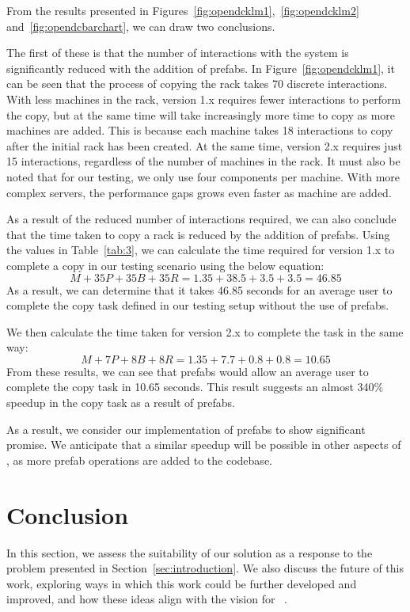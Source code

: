 \documentclass[11pt]{article}
\begin{document}
			From the results presented in Figures~\ref{fig:opendcklm1},~\ref{fig:opendcklm2} and~\ref{fig:opendcbarchart}, we can draw two conclusions.

			The first of these is that the number of interactions with the system is significantly reduced with the addition of prefabs.
			In Figure~\ref{fig:opendcklm1}, it can be seen that the process of copying the rack takes 70 discrete interactions.
			With less machines in the rack, version 1.x requires fewer interactions to perform the copy, but at the same time will take increasingly more time to copy as more machines are added.
			This is because each machine takes 18 interactions to copy after the initial rack has been created.
			At the same time, version 2.x requires just 15 interactions, regardless of the number of machines in the rack.
			It must also be noted that for our testing, we only use four components per machine.
			With more complex servers, the performance gaps grows even faster as machine are added.

			As a result of the reduced number of interactions required, we can also conclude that the time taken to copy a rack is reduced by the addition of prefabs.
			Using the values in Table~\ref{tab:3}, we can calculate the time required for version 1.x to complete a copy in our testing scenario using the below equation:
			$$M + 35P + 35B + 35R= 1.35 + 38.5 + 3.5 + 3.5= 46.85$$
			As a result, we can determine that it takes 46.85 seconds for an average user to complete the copy task defined in our testing setup without the use of prefabs.

			We then calculate the time taken for version 2.x to complete the task in the same way:
			$$M + 7P + 8B + 8R= 1.35 + 7.7 + 0.8 + 0.8= 10.65$$
			From these results, we can see that prefabs would allow an average user to complete the copy task in 10.65 seconds.
			This result suggests an almost 340\% speedup in the copy task as a result of prefabs.

			As a result, we consider our implementation of prefabs to show significant promise. We anticipate that a similar speedup will be possible in other aspects of \opendc{}, as more prefab operations are added to the \opendc{} codebase.

\newpage

\section{Conclusion} \label{sec:conclusion}
	In this section, we assess the suitability of our solution as a response to the problem presented in Section~\ref{sec:introduction}.
	We also discuss the future of this work, exploring ways in which this work could be further developed and improved, and how these ideas align with the vision for \opendc{}~\cite{Iosup2017}.
\end{document}
